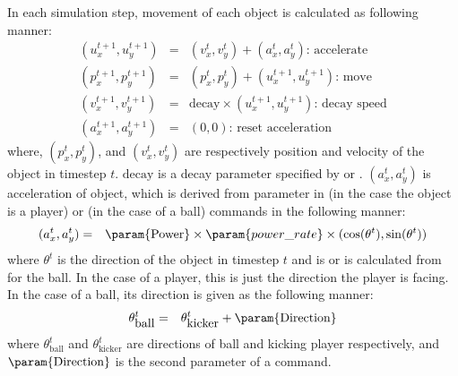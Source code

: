 In each simulation step, 
movement of each object is calculated as following manner:
\begin{eqnarray}
  (u_x^{t+1},u_y^{t+1}) & = & 
        (v_x^{t}, v_y^{t}) + (a_x^{t}, a_y^{t})      \mbox{: accelerate}
\label{eq:u-t} \\
  (p_x^{t+1},p_y^{t+1}) & = & 
        (p_x^{t}, p_y^{t}) + (u_x^{t+1}, u_y^{t+1})  \mbox{: move}
                                        \nonumber \\
  (v_x^{t+1},v_y^{t+1}) & = & 
        \mbox{decay} \times (u_x^{t+1}, u_y^{t+1})   \mbox{: decay speed}
                                        \nonumber \\
  (a_x^{t+1},a_y^{t+1}) & = & 
        (0,0)     \mbox{: reset acceleration}
                                        \nonumber
\end{eqnarray}
where, 
$(p_x^{t},p_y^{t})$, and $(v_x^{t}, v_y^{t})$
are respectively position and velocity of the object in timestep $t$.
$\mbox{decay}$ is a decay parameter specified by
 or .
$(a_x^{t},a_y^{t})$ is acceleration of object,
which is derived from  parameter in 
 (in the case the object is a player) or
 (in the case of a ball) commands
in the following manner:
\begin{eqnarray}
  (a_x^{t},a_y^{t}) & = & 
        \mbox{\param{Power}} \times \param{power\_rate}
          \times (\cos(\theta^t),\sin(\theta^t)) 
                                        \nonumber 
\end{eqnarray}
where $\theta^t$ is the direction of the object in timestep $t$ and
 is  or is calculated from
 for the ball.
In the case of a player, this is just the direction the player is facing.
In the case of a ball,
its direction is given as the following manner:
\begin{eqnarray}
  \theta^t_{\mbox{ball}} & = & 
        \theta^t_{\mbox{kicker}} + \mbox{\param{Direction}} 
                                        \nonumber
\end{eqnarray}
where $\theta^t_{\mbox{ball}}$ and $\theta^t_{\mbox{kicker}}$ 
are directions of ball and kicking player respectively,
and $\mbox{\param{Direction}}$ is the second parameter of 
a  command. 

